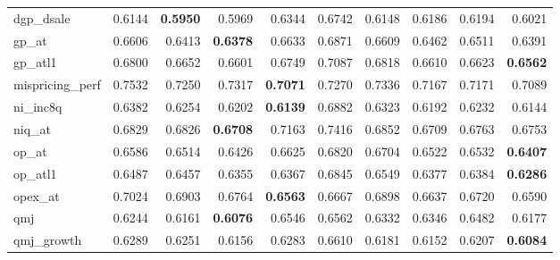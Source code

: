 \begin{longtable}{>{\raggedright\arraybackslash}p{2.6cm}rrrrrrrrr}
dgp\_dsale & 0.6144 & \textbf{\cellcolor{blue!10}0.5950} & \cellcolor{blue!10}0.5969 & 0.6344 & 0.6742 & 0.6148 & 0.6186 & 0.6194 & \cellcolor{blue!10}0.6021 \\
gp\_at & 0.6606 & \cellcolor{blue!10}0.6413 & \textbf{\cellcolor{blue!10}0.6378} & 0.6633 & 0.6871 & 0.6609 & \cellcolor{blue!10}0.6462 & \cellcolor{blue!10}0.6511 & \cellcolor{blue!10}0.6391 \\
gp\_atl1 & 0.6800 & \cellcolor{blue!10}0.6652 & \cellcolor{blue!10}0.6601 & \cellcolor{blue!10}0.6749 & 0.7087 & 0.6818 & \cellcolor{blue!10}0.6610 & \cellcolor{blue!10}0.6623 & \textbf{\cellcolor{blue!10}0.6562} \\
mispricing\_perf & 0.7532 & \cellcolor{blue!10}0.7250 & \cellcolor{blue!10}0.7317 & \textbf{\cellcolor{blue!10}0.7071} & \cellcolor{blue!10}0.7270 & \cellcolor{blue!10}0.7336 & \cellcolor{blue!10}0.7167 & \cellcolor{blue!10}0.7171 & \cellcolor{blue!10}0.7089 \\
ni\_inc8q & 0.6382 & \cellcolor{blue!10}0.6254 & \cellcolor{blue!10}0.6202 & \textbf{\cellcolor{blue!10}0.6139} & 0.6882 & \cellcolor{blue!10}0.6323 & \cellcolor{blue!10}0.6192 & \cellcolor{blue!10}0.6232 & \cellcolor{blue!10}0.6144 \\
niq\_at & 0.6829 & \cellcolor{blue!10}0.6826 & \textbf{\cellcolor{blue!10}0.6708} & 0.7163 & 0.7416 & 0.6852 & \cellcolor{blue!10}0.6709 & \cellcolor{blue!10}0.6763 & \cellcolor{blue!10}0.6753 \\
op\_at & 0.6586 & \cellcolor{blue!10}0.6514 & \cellcolor{blue!10}0.6426 & 0.6625 & 0.6820 & 0.6704 & \cellcolor{blue!10}0.6522 & \cellcolor{blue!10}0.6532 & \textbf{\cellcolor{blue!10}0.6407} \\
op\_atl1 & 0.6487 & \cellcolor{blue!10}0.6457 & \cellcolor{blue!10}0.6355 & \cellcolor{blue!10}0.6367 & 0.6845 & 0.6549 & \cellcolor{blue!10}0.6377 & \cellcolor{blue!10}0.6384 & \textbf{\cellcolor{blue!10}0.6286} \\
opex\_at & 0.7024 & \cellcolor{blue!10}0.6903 & \cellcolor{blue!10}0.6764 & \textbf{\cellcolor{blue!10}0.6563} & \cellcolor{blue!10}0.6667 & \cellcolor{blue!10}0.6898 & \cellcolor{blue!10}0.6637 & \cellcolor{blue!10}0.6720 & \cellcolor{blue!10}0.6590 \\
qmj & 0.6244 & \cellcolor{blue!10}0.6161 & \textbf{\cellcolor{blue!10}0.6076} & 0.6546 & 0.6562 & 0.6332 & 0.6346 & 0.6482 & \cellcolor{blue!10}0.6177 \\
qmj\_growth & 0.6289 & \cellcolor{blue!10}0.6251 & \cellcolor{blue!10}0.6156 & \cellcolor{blue!10}0.6283 & 0.6610 & \cellcolor{blue!10}0.6181 & \cellcolor{blue!10}0.6152 & \cellcolor{blue!10}0.6207 & \textbf{\cellcolor{blue!10}0.6084} \\

\end{longtable}

